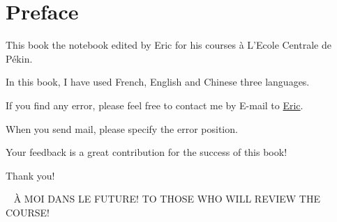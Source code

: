 \chapter*{Preface}
This book the notebook edited by Eric for his courses \`a L'Ecole Centrale de P\'ekin. \par
In this book, I have used French, English and Chinese three languages. \par
If you find any error, please feel free to contact me by E-mail to \href{mailto:wangchaogo1990@gmail.com}{Eric}. \par
When you send mail, please specify the error position.\par
Your feedback is a great contribution for the success of this book!\par
Thank you!
\par
\newpage
\begin{center}
\  %
\vfill
\large{\`A MOI DANS LE FUTURE!}
\vskip 1cm
\large{TO THOSE WHO WILL REVIEW THE COURSE!}
\vfill
\end{center}
\mainmatter

